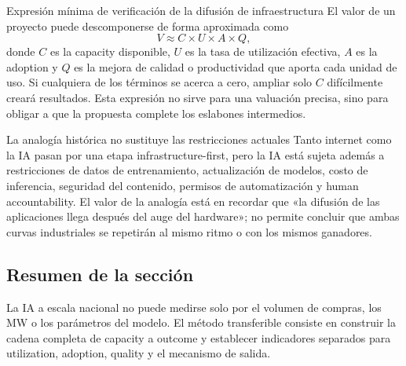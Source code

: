 \begin{importantbox}{Expresión mínima de verificación de la difusión de infraestructura}
El valor de un proyecto puede descomponerse de forma aproximada como
\[
V \approx C\times U\times A\times Q,
\]
donde $C$ es la capacity disponible, $U$ es la tasa de utilización efectiva, $A$ es la adoption y $Q$ es la mejora de calidad o productividad que aporta cada unidad de uso. Si cualquiera de los términos se acerca a cero, ampliar solo $C$ difícilmente creará resultados. Esta expresión no sirve para una valuación precisa, sino para obligar a que la propuesta complete los eslabones intermedios.
\end{importantbox}

\begin{warningbox}{La analogía histórica no sustituye las restricciones actuales}
Tanto internet como la IA pasan por una etapa infrastructure-first, pero la IA está sujeta además a restricciones de datos de entrenamiento, actualización de modelos, costo de inferencia, seguridad del contenido, permisos de automatización y human accountability. El valor de la analogía está en recordar que «la difusión de las aplicaciones llega después del auge del hardware»; no permite concluir que ambas curvas industriales se repetirán al mismo ritmo o con los mismos ganadores.
\end{warningbox}

\subsection{Resumen de la sección}

La IA a escala nacional no puede medirse solo por el volumen de compras, los MW o los parámetros del modelo. El método transferible consiste en construir la cadena completa de capacity a outcome y establecer indicadores separados para utilization, adoption, quality y el mecanismo de salida.
